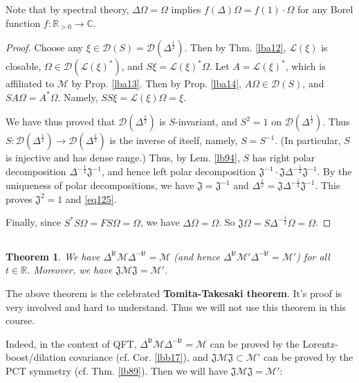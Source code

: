 \documentclass[12pt,b5paper,notitlepage]{article}
\theoremstyle{definition}
\theoremstyle{plain}
\newtheorem{thm}[df]{Theorem}
\newcommand{\fk}{\mathfrak}
\newcommand{\mc}{\mathcal}
\newcommand{\Dom}{\scr{D}}
\newcommand{\scr}{\mathscr}
\newcommand{\im}{\mathbf{i}}
\newcommand{\Cbb}{\mathbb C}
\newcommand{\Rbb}{\mathbb R}
\newcommand{\half}{\frac{1}{2}}
\numberwithin{equation}{section}
\begin{document}
Note that by spectral theory, $\Delta\Omega=\Omega$ implies $f(\Delta)\Omega=f(1)\cdot\Omega$ for any Borel function $f:\Rbb_{>0}\rightarrow\Cbb$.




\begin{proof}
Choose any $\xi\in\Dom(S)=\Dom(\Delta^{\frac12})$. Then by Thm. \ref{lba12}, $\scr L(\xi)$ is closable, $\Omega\in\Dom(\scr L(\xi)^*)$, and $S\xi=\scr L(\xi)^*\Omega$. Let $A=\scr L(\xi)^*$, which is affiliated to $\mc M$ by Prop. \ref{lba13}.	Then by Prop. \ref{lba14}, $A\Omega\in\Dom(S)$, and $SA\Omega=A^*\Omega$. Namely, $SS\xi=\scr L(\xi)\Omega=\xi$. 

We have thus proved that $\Dom(\Delta^\half)$ is $S$-invariant, and $S^2=1$ on $\Dom(\Delta^\half)$. Thus $S:\Dom(\Delta^\half)\rightarrow\Dom(\Delta^\half)$ is the inverse of itself, namely, $S=S^{-1}$. (In particular, $S$ is injective and has dense range.) Thus, by Lem. \ref{lb94}, $S$ has right polar decomposition $\Delta^{-\half}\fk J^{-1}$, and hence left polar decomposition $\fk J^{-1}\cdot \fk J\Delta^{-\frac 12}\fk J^{-1}$. By the uniqueness of polar decompositions, we have $\fk J=\fk J^{-1}$ and $\Delta^{\frac 12}=\fk J\Delta^{-\frac 12}\fk J^{-1}$. This proves $\fk J^2=1$ and \eqref{eq125}.

Finally, since $S^*S\Omega=FS\Omega=\Omega$, we have $\Delta\Omega=\Omega$. So $\fk J\Omega=S\Delta^{-\half}\Omega=\Omega$.
\end{proof}










\subsection{}




\begin{thm}
We have $\Delta^{\im t}\mc M\Delta^{-\im t}=\mc M$ (and hence $\Delta^{\im t}\mc M'\Delta^{-\im t}=\mc M'$) for all $t\in\Rbb$. Moreover, we have $\fk J\mc M\fk J=\mc M'$.
\end{thm}

The above theorem is the celebrated \textbf{Tomita-Takesaki theorem}. It's proof is very involved and hard to understand. Thus we will not use this theorem in this course. 

Indeed, in the context of QFT, $\Delta^{\im t}\mc M\Delta^{-\im t}=\mc M$ can be proved by the Lorentz-boost/dilation covariance (cf. Cor. \ref{lbb17}), and $\fk J\mc M\fk J\subset\mc M'$ can be proved by the PCT symmetry (cf. Thm. \ref{lb89}). Then we will have $\fk J\mc M\fk J=\mc M'$:
\end{document}
